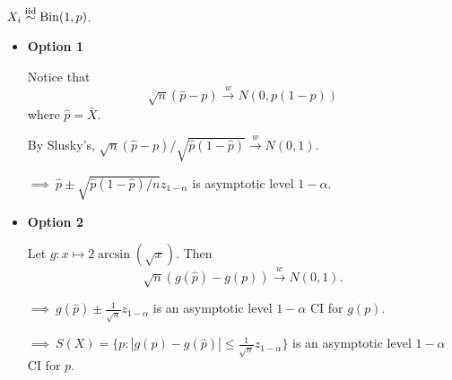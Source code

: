 \begin{exap}
	$X_i\stackrel{\text{iid}}{\sim} \mathrm{Bin}(1,p)$. 
	
	\begin{itemize}
		\item \textbf{Option 1}
		
		
		Notice that 
		$$\sqrt{n}(\hat{p} - p) \xrightarrow{w} N(0, p(1-p))$$
		where $\hat{p} = \bar{X}$.
	
		By Slusky's, $\sqrt{n}(\hat{p} - p)/\sqrt{ \hat{p}(1-\hat{p}) } \xrightarrow{w} N(0,1)$.
		
		$\implies \ \hat{p} \pm \sqrt{ \hat{p}(1-\hat{p})/n } z_{1-\alpha}$ is asymptotic level $1-\alpha$.
		
		\item \textbf{Option 2}
		
		Let $g:x \mapsto 2\arcsin(\sqrt{x})$. Then
		$$\sqrt{n}( g(\hat{p}) - g(p) ) \xrightarrow{w} N(0,1).$$
		
		$\implies \ g(\hat{p}) \pm  \frac{1}{\sqrt{n}} z_{1-\alpha}$ is an asymptotic level $1-\alpha$ CI for $g(p)$.
		
		$\implies \ S(X) = \{ p: | g(p) - g(\hat{p}) |\leq \frac{1}{\sqrt{n}} z_{1-\alpha} \}$ is an asymptotic level $1-\alpha$ CI for $p$.
	\end{itemize}
\end{exap}